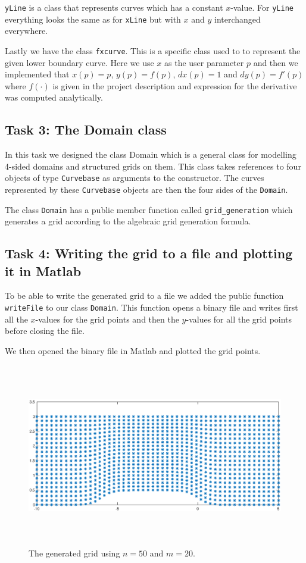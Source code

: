 \documentclass[a4paper,10pt]{article}
\begin{document}
\texttt{yLine} is a class that represents curves which has a constant $x$-value. For \texttt{yLine} everything looks the same as for \texttt{xLine} but with $x$ and $y$ interchanged everywhere.

Lastly we have the class \texttt{fxcurve}. This is a specific class used to to represent the given lower boundary curve. Here we use $x$ as the user parameter $p$ and then we implemented that $x(p) = p$, $y(p) = f(p)$, $dx(p) = 1$ and $dy(p) = f'(p)$ where $f(\cdot)$ is given in the project description and expression for the derivative was computed analytically.  
 

\subsection*{Task 3: The Domain class}
In this task we designed the class Domain which is a general class for modelling 4-sided domains and structured grids on them. This class takes references to four objects of type \texttt{Curvebase} as arguments to the constructor. The curves represented by these \texttt{Curvebase} objects are then the four sides of the \texttt{Domain}. 


The class \texttt{Domain} has a public member function called \texttt{grid\_generation} which generates a grid according to the algebraic grid generation formula.

\subsection*{Task 4: Writing the grid to a file and plotting it in Matlab}
To be able to write the generated grid to a file we added the public function \texttt{writeFile} to our class \texttt{Domain}. This function opens a binary file and writes first all the $x$-values for the grid points and then the $y$-values for all the grid points before closing the file. 

We then opened the binary file in Matlab and plotted the grid points. 

\begin{figure}[!ht]
  \centering
  \includegraphics[width = 13cm, height = 8cm]{50x20}
  \begin{minipage}[t]{100mm}
    \caption{
      The generated grid using $n = 50$ and $m = 20$.
    }\label{FIG_jjj}
  \end{minipage}
\end{figure}
\end{document}
